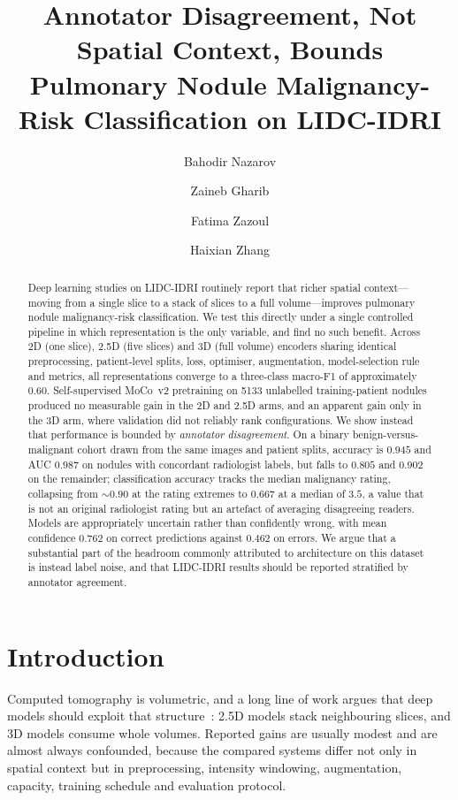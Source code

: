 \documentclass[11pt]{article}
\title{Annotator Disagreement, Not Spatial Context, Bounds Pulmonary
Nodule Malignancy-Risk Classification on LIDC-IDRI}
\author[1]{Bahodir Nazarov}
\author[1]{Zaineb Gharib}
\author[1]{Fatima Zazoul}
\author[1]{Haixian Zhang}
\affil[1]{\small Sichuan University}
\date{}
\begin{document}
\maketitle

\begin{abstract}
Deep learning studies on LIDC-IDRI routinely report that richer spatial
context---moving from a single slice to a stack of slices to a full
volume---improves pulmonary nodule malignancy-risk classification. We test this
directly under a single controlled pipeline in which representation is the only
variable, and find no such benefit. Across 2D (one slice), 2.5D (five slices)
and 3D (full volume) encoders sharing identical preprocessing, patient-level
splits, loss, optimiser, augmentation, model-selection rule and metrics, all
representations converge to a three-class macro-F1 of approximately $0.60$.
Self-supervised MoCo~v2 pretraining on 5133 unlabelled training-patient nodules
produced no measurable gain in the 2D and 2.5D arms, and an apparent gain only
in the 3D arm, where validation did not reliably rank configurations. We show
instead that performance is bounded by \emph{annotator disagreement}. On a binary
benign-versus-malignant cohort drawn from the same images and patient splits,
accuracy is $0.945$ and AUC $0.987$ on nodules with concordant radiologist
labels, but falls to $0.805$ and $0.902$ on the remainder; classification
accuracy tracks the median malignancy rating, collapsing from $\sim\!0.90$ at
the rating extremes to $0.667$ at a median of $3.5$, a value that is not an
original radiologist rating but an artefact of averaging disagreeing readers.
Models are appropriately uncertain rather than confidently wrong, with mean
confidence $0.762$ on correct predictions against $0.462$ on errors. We argue
that a substantial part of the headroom commonly attributed to architecture on
this dataset is instead label noise, and that LIDC-IDRI results should be
reported stratified by annotator agreement.
\end{abstract}

\section{Introduction}

Computed tomography is volumetric, and a long line of work argues that deep
models should exploit that structure~\citep{setio2016multiview,
hussein2017risk,zhu2018deeplung,yang2021acs}: 2.5D models stack neighbouring
slices, and 3D models consume whole volumes. Reported gains are usually modest and are
almost always confounded, because the compared systems differ not only in
spatial context but in preprocessing, intensity windowing, augmentation,
capacity, training schedule and evaluation protocol.
\end{document}
